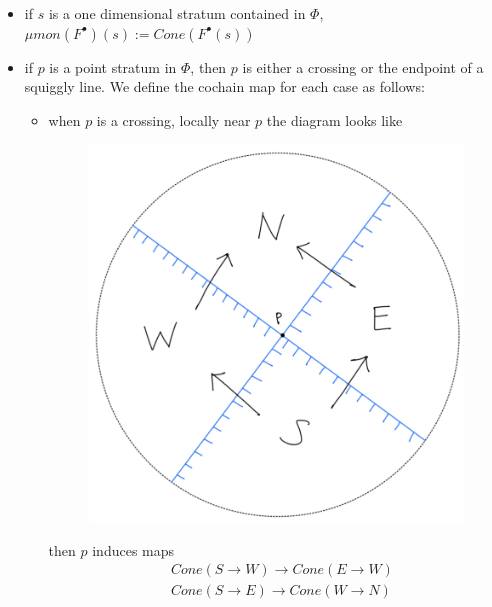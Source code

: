 \begin{itemize}
\item if $s$ is a one dimensional stratum contained in $\Phi$, $\mu mon (F^\bullet)(s):=Cone(F^\bullet(s))$

\item if $p$ is a point stratum in $\Phi$, then $p$ is either a crossing or the endpoint of a squiggly line. We define the cochain map for each case as follows:
\begin{itemize}
\item when $p$ is a crossing, locally near $p$ the diagram looks like
\begin{figure}[H] 
    \centering
    \includegraphics[scale = 0.55]{diagrams/intro/3.png}
    \caption{}
    \label{fig:your-label}
\end{figure}
then $p$ induces maps
\begin{align*}
& Cone(S\rightarrow W) \rightarrow Cone(E\rightarrow W)\\
& Cone(S\rightarrow E) \rightarrow Cone(W\rightarrow N)\\
\end{align*}


\end{itemize}
\end{itemize}
